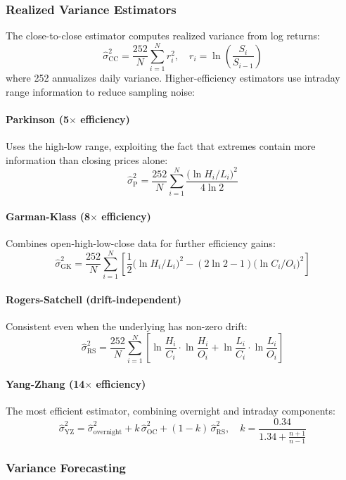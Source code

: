 \subsubsection{Realized Variance Estimators}

The close-to-close estimator computes realized variance from log returns:
\[
\hat\sigma^2_{\text{CC}} = \frac{252}{N} \sum_{i=1}^{N} r_i^2, \quad r_i = \ln \left( \frac{S_i}{S_{i-1}} \right)
\]
where 252 annualizes daily variance. Higher-efficiency estimators use intraday range information to reduce sampling noise:

\paragraph{Parkinson (5$\times$ efficiency)}
Uses the high-low range, exploiting the fact that extremes contain more information than closing prices alone:
\[
\hat\sigma^2_{\text{P}} = \frac{252}{N} \sum_{i=1}^{N} \frac{\bigl(\ln H_i / L_i\bigr)^2}{4 \ln 2}
\]

\paragraph{Garman-Klass (8$\times$ efficiency)}
Combines open-high-low-close data for further efficiency gains:
\[
\hat\sigma^2_{\text{GK}} = \frac{252}{N} \sum_{i=1}^{N} \left[ \frac{1}{2} \bigl(\ln H_i / L_i\bigr)^2 - (2 \ln 2 - 1) \bigl(\ln C_i / O_i\bigr)^2 \right]
\]

\paragraph{Rogers-Satchell (drift-independent)}
Consistent even when the underlying has non-zero drift:
\[
\hat\sigma^2_{\text{RS}} = \frac{252}{N} \sum_{i=1}^{N} \left[ \ln \frac{H_i}{C_i} \cdot \ln \frac{H_i}{O_i} + \ln \frac{L_i}{C_i} \cdot \ln \frac{L_i}{O_i} \right]
\]

\paragraph{Yang-Zhang (14$\times$ efficiency)}
The most efficient estimator, combining overnight and intraday components:
\[
\hat\sigma^2_{\text{YZ}} = \hat\sigma^2_{\text{overnight}} + k \, \hat\sigma^2_{\text{OC}} + (1 - k) \, \hat\sigma^2_{\text{RS}}, \quad k = \frac{0.34}{1.34 + \frac{n+1}{n-1}}
\]

\subsubsection{Variance Forecasting}

